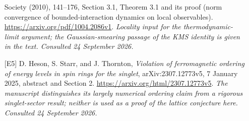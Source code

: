 \documentclass[11pt]{article}
\begin{document}
\begin{itemize}
		Society (2010), 141--176, Section 3.1, Theorem 3.1 and its proof
		(norm convergence of bounded-interaction dynamics on local observables).
		\url{https://arxiv.org/pdf/1004.2086v1}.
		{\small\textit{Locality input for the thermodynamic-limit argument;
				the Gaussian-smearing passage of the KMS identity is given in the text.
				Consulted 24 September 2026.}}
		\item[\textnormal{[E5]}]\hypertarget{extra:202:5}{}
		D. Heson, S. Starr, and J. Thornton, \emph{Violation of ferromagnetic
			ordering of energy levels in spin rings for the singlet},
		arXiv:2307.12773v5, 7 January 2025, abstract and Section 2.
		\url{https://arxiv.org/html/2307.12773v5}.
		{\small\textit{The manuscript distinguishes its largely numerical
				ordering claim from a rigorous singlet-sector result; neither is
				used as a proof of the lattice conjecture here. Consulted
				24 September 2026.}}
	\end{itemize}
\end{document}
